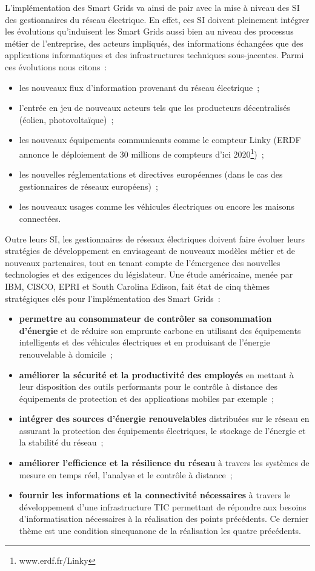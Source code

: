 L'implémentation des Smart Grids va ainsi de pair avec la mise à niveau des SI 
des gestionnaires du réseau électrique. En effet, ces SI doivent pleinement 
intégrer les évolutions qu'induisent les Smart Grids aussi bien au niveau des 
processus métier de l'entreprise, des acteurs impliqués, des informations 
échangées que des applications informatiques et des infrastructures techniques 
sous-jacentes. Parmi ces évolutions nous citons~:
\begin{itemize}
\item les nouveaux flux d'information provenant du réseau électrique~;
\item l'entrée en jeu de nouveaux acteurs tels que les producteurs décentralisés 
(éolien, photovoltaïque)~;
\item les nouveaux équipements communicants comme le compteur Linky (ERDF 
annonce le déploiement de 30 millions de compteurs d'ici 
2020\footnote{www.erdf.fr/Linky})~;
\item les nouvelles réglementations et directives européennes (dans le cas des 
gestionnaires de réseaux européens)~;
\item les nouveaux usages comme les véhicules électriques ou encore les maisons 
connectées.
\end{itemize}

Outre leurs SI, les gestionnaires de réseaux électriques doivent faire évoluer 
leurs stratégies de développement en envisageant de nouveaux modèles métier et 
de nouveaux partenaires, tout en tenant compte de l'émergence des nouvelles 
technologies et des exigences du législateur. Une étude américaine, menée par 
IBM, CISCO, EPRI et South Carolina Edison, fait état de cinq thèmes stratégiques 
clés pour l'implémentation des Smart Grids~:
\begin{itemize}
\item \textbf{permettre au consommateur de contrôler sa consommation d'énergie} 
et de réduire son emprunte carbone en utilisant des équipements intelligents et 
des véhicules électriques et en produisant de l'énergie renouvelable à 
domicile~;
\item \textbf{améliorer la sécurité et la productivité des employés} en mettant 
à leur disposition des outils performants pour le contrôle à distance des 
équipements de protection et des applications mobiles par exemple~;
\item \textbf{intégrer des sources d'énergie renouvelables} distribuées sur le 
réseau en assurant la protection des équipements électriques, le stockage de 
l'énergie et la stabilité du réseau~;
\item \textbf{améliorer l'efficience et la résilience du réseau} à travers les 
systèmes de mesure en temps réel, l'analyse et le contrôle à distance~;
\item \textbf{fournir les informations et la connectivité nécessaires} à travers 
le développement d'une infrastructure TIC permettant de répondre aux besoins 
d'informatisation nécessaires à la réalisation des points précédents. Ce dernier thème est une condition sinequanone de la réalisation les quatre précédents.
\end{itemize}

